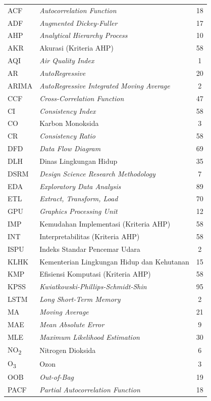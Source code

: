 \begin{longtable}{@{} l >{\raggedright\arraybackslash}p{7.5cm} c @{}}
ACF & \textit{Autocorrelation Function} & 18 \\
ADF & \textit{Augmented Dickey-Fuller} & 17 \\
AHP & \textit{Analytical Hierarchy Process} & 10 \\
AKR & Akurasi (Kriteria AHP) & 58 \\
AQI & \textit{Air Quality Index} & 1 \\
AR & \textit{AutoRegressive} & 20 \\
ARIMA & \textit{AutoRegressive Integrated Moving Average} & 2 \\
CCF & \textit{Cross-Correlation Function} & 47 \\
CI & \textit{Consistency Index} & 58 \\
CO & Karbon Monoksida & 3 \\
CR & \textit{Consistency Ratio} & 58 \\
DFD & \textit{Data Flow Diagram} & 69 \\
DLH & Dinas Lingkungan Hidup & 35 \\
DSRM & \textit{Design Science Research Methodology} & 7 \\
EDA & \textit{Exploratory Data Analysis} & 89 \\
ETL & \textit{Extract, Transform, Load} & 70 \\
GPU & \textit{Graphics Processing Unit} & 12 \\
IMP & Kemudahan Implementasi (Kriteria AHP) & 58 \\
INT & Interpretabilitas (Kriteria AHP) & 58 \\
ISPU & Indeks Standar Pencemar Udara & 2 \\
KLHK & Kementerian Lingkungan Hidup dan Kehutanan & 15 \\
KMP & Efisiensi Komputasi (Kriteria AHP) & 58 \\
KPSS & \textit{Kwiatkowski-Phillips-Schmidt-Shin} & 95 \\
LSTM & \textit{Long Short-Term Memory} & 2 \\
MA & \textit{Moving Average} & 21 \\
MAE & \textit{Mean Absolute Error} & 9 \\
MLE & \textit{Maximum Likelihood Estimation} & 30 \\
NO\textsubscript{2} & Nitrogen Dioksida & 6 \\
O\textsubscript{3} & Ozon & 3 \\
OOB & \textit{Out-of-Bag} & 19 \\
PACF & \textit{Partial Autocorrelation Function} & 18 \\

\end{longtable}
